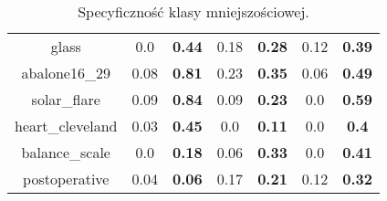 \begin{table}[H]
\begin{center}
{\begin{tabular}{c|cccccc}
				glass&0.0&\textbf{0.44}&0.18&\textbf{0.28}&0.12&\textbf{0.39}\\%
				abalone16\_29&0.08&\textbf{0.81}&0.23&\textbf{0.35}&0.06&\textbf{0.49}\\%
				solar\_flare&0.09&\textbf{0.84}&0.09&\textbf{0.23}&0.0&\textbf{0.59}\\%
				heart\_cleveland&0.03&\textbf{0.45}&0.0&\textbf{0.11}&0.0&\textbf{0.4}\\%
				balance\_scale&0.0&\textbf{0.18}&0.06&\textbf{0.33}&0.0&\textbf{0.41}\\%
				postoperative&0.04&\textbf{0.06}&0.17&\textbf{0.21}&0.12&\textbf{0.32}\\%
			\end{tabular}}
			\caption{Specyficzność klasy mniejszościowej.}
			\label{specsmote}
		\end{center}
	\end{table}
